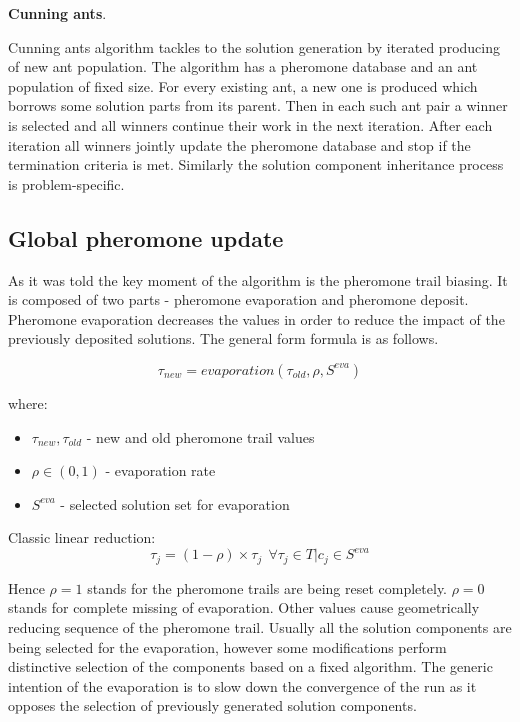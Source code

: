 \textbf{Cunning ants}.

Cunning ants algorithm tackles to the solution generation by iterated producing of new ant population. The algorithm has a pheromone database and an ant population of fixed size. For every existing ant, a new one is produced which borrows some solution parts from its parent. Then in each such ant pair a winner is selected and all winners continue their work in the next iteration. After each iteration all winners jointly update the pheromone database and stop if the termination criteria is met. Similarly the solution component inheritance process is problem-specific.





\subsection{Global pheromone update}
As it was told the key moment of the algorithm is the pheromone trail biasing. It is composed of two parts - pheromone evaporation and pheromone deposit. Pheromone evaporation decreases the values in order to reduce the impact of the previously deposited solutions. The general form formula is as follows.

\begin{equation}
\tau_{new}=evaporation(\tau_{old}, \rho, S^{eva})
\end{equation}

where:
\begin{itemize}
\item $\tau_{new}, \tau_{old}$ - new and old pheromone trail values
\item $\rho \in (0,1)$ - evaporation rate
\item $S^{eva}$ - selected solution set for evaporation
\end{itemize}

Classic linear reduction:
\begin{equation}
\tau_j = (1-\rho) \times \tau_j \ \ \forall  \tau_j \in T | c_j \in S^{eva}
\end{equation}

Hence $\rho=1$ stands for the pheromone trails are being reset completely. $\rho=0$ stands for complete missing of evaporation. Other values cause geometrically reducing sequence of the pheromone trail. Usually all the solution components are being selected for the evaporation, however some modifications perform distinctive selection of the components based on a fixed algorithm. The generic intention of the evaporation is to slow down the convergence of the run as it opposes the selection of previously generated solution components. \\


